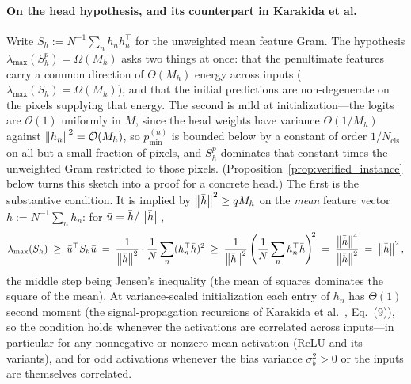 \paragraph{On the head hypothesis, and its counterpart in Karakida et al.}
Write $S_h := N^{-1} \sum_n h_n h_n^\top$ for the unweighted mean feature
Gram. The hypothesis $\lambda_{\max}(S_h^{p}) = \Omega(M_h)$ asks two things
at once: that the penultimate features carry a common direction of
$\Theta(M_h)$ energy across inputs ($\lambda_{\max}(S_h) = \Omega(M_h)$),
and that the initial predictions are non-degenerate on the pixels supplying
that energy. The second is mild at initialization---the logits are
$\mathcal{O}(1)$ uniformly in $M$, since the head weights have variance
$\Theta(1/M_h)$ against $\left\lVert h_n\right\rVert^2 = \mathcal{O}(M_h)$, so
$p^{(n)}_{\min}$ is bounded below by a constant of order
$1/N_{\mathrm{cls}}$ on all but a small fraction of pixels, and $S_h^{p}$
dominates that constant times the unweighted Gram restricted to those
pixels. (Proposition~\ref{prop:verified_instance} below turns this sketch
into a proof for a concrete head.) The first is the substantive condition.
It is implied by $\left\lVert\bar{h}\right\rVert^2 \geq q M_h$ on the \emph{mean} feature
vector $\bar{h} := N^{-1}\sum_n h_n$: for $\bar{u} =
\bar{h}/\left\lVert\bar{h}\right\rVert$,
\[
    \lambda_{\max}(S_h)
    \;\geq\; \bar{u}^\top S_h \bar{u}
    \;=\; \frac{1}{\left\lVert\bar{h}\right\rVert^2} \cdot
        \frac{1}{N}\sum_n (h_n^\top \bar{h})^2
    \;\geq\; \frac{1}{\left\lVert\bar{h}\right\rVert^2}
        \left( \frac{1}{N}\sum_n h_n^\top \bar{h} \right)^{\!2}
    \;=\; \frac{\left\lVert\bar{h}\right\rVert^4}{\left\lVert\bar{h}\right\rVert^2}
    \;=\; \left\lVert\bar{h}\right\rVert^2,
\]
the middle step being Jensen's inequality (the mean of squares dominates the
square of the mean). At variance-scaled initialization each entry of $h_n$
has $\Theta(1)$ second moment (the signal-propagation recursions of
Karakida et al.~\citep{karakida2019universal}, Eq.~(9)), so the condition
holds whenever the activations are correlated across inputs---in particular
for any nonnegative or nonzero-mean activation (ReLU and its variants), and
for odd activations whenever the bias variance $\sigma_b^2 > 0$ or the
inputs are themselves correlated.

